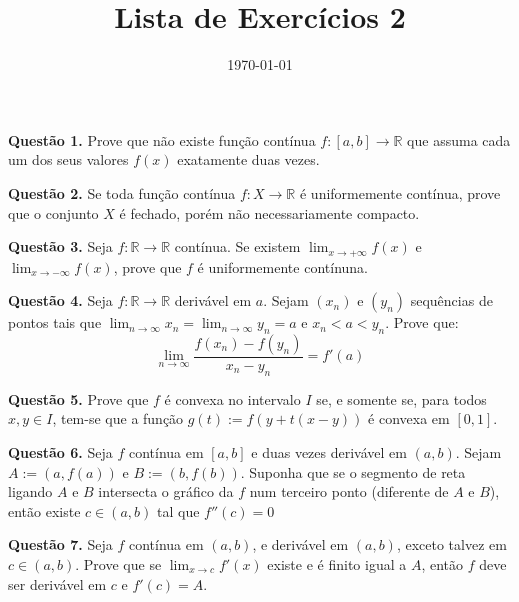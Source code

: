 \documentclass[10pt]{article}
\title{Lista de Exercícios 2}
\author{}
\date{\today}
\theoremstyle{definition}
\begin{document}
\maketitle

\noindent
\textbf{Questão 1.}
Prove que não existe função contínua $f:[a,b] \to \mathbb R$
que assuma cada um dos seus valores $f(x)$ exatamente duas vezes.
\vspace{5mm}

\noindent
\textbf{Questão 2.}
Se toda função contínua $f: X \to \mathbb R$ é uniformemente contínua, prove que o
conjunto $X$ é fechado, porém não necessariamente compacto.
\vspace{5mm}

\noindent
\textbf{Questão 3.}
Seja $f:\mathbb R \to \mathbb R$ contínua. Se existem
$\lim_{x\to +\infty} f(x)$ e
$\lim_{x\to -\infty} f(x)$, prove que $f$ é uniformemente contínuna.
\vspace{5mm}

\noindent
\textbf{Questão 4.}
Seja $f:\mathbb R \to \mathbb R$ derivável em $a$. Sejam $(x_n)$ e $(y_n)$ sequências
de pontos tais que $\lim_{n\to \infty} x_n = \lim_{n\to \infty} y_n = a$
e $x_n < a < y_n$. Prove que:
\begin{equation*}
	\lim_{n\to \infty } \frac{f(x_n)-f(y_n)}{x_n - y_n} = f'(a)
\end{equation*}
\vspace{5mm}

\noindent
\textbf{Questão 5.}
Prove que $f$ é convexa no intervalo $I$ se, e somente se, para todos $x,y \in I$, tem-se
que a função $g(t):= f(y + t(x-y))$ é convexa em $[0,1]$.
\vspace{5mm}

\noindent
\textbf{Questão 6.}
Seja $f$ contínua em $[a,b]$ e duas vezes derivável em $(a,b)$. Sejam
$A:=(a,f(a))$ e $B:=(b,f(b))$. Suponha que se o segmento de reta ligando
$A$ e $B$ intersecta o gráfico da $f$ num terceiro ponto (diferente de $A$ e $B$),
então existe $c\in (a,b)$ tal que $f''(c)=0$
\vspace{5mm}

\noindent
\textbf{Questão 7.}
Seja $f$ contínua em $(a,b)$, e derivável em $(a,b)$, exceto talvez em $c \in (a,b)$.
Prove que se $\lim_{x \to c} f'(x)$ existe e é finito igual a $A$, então $f$
deve ser derivável em $c$ e $f'(c) = A$.
\vspace{5mm}
\nocite{*}

  
  
\end{document}
